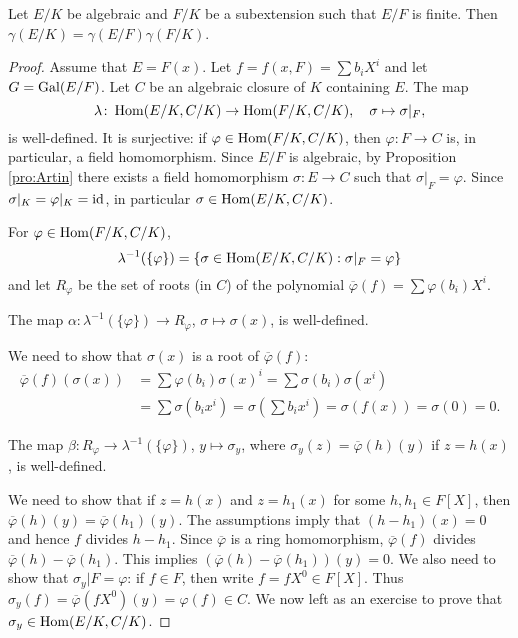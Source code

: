 \begin{proposition}
    Let $E/K$ be algebraic and $F/K$ be a subextension such that 
    $E/F$ is finite. Then $\gamma(E/K)=\gamma(E/F)\gamma(F/K)$. 
\end{proposition}

 \begin{proof}
    Assume that $E=F(x)$. Let $f=f(x,F)=\sum b_iX^i$ and
    let $G=\operatorname{Gal}(E/F)$. Let $C$ be an algebraic closure of $K$ containing $E$. 
    The map
    \[
    \lambda\colon \operatorname{Hom}(E/K,C/K)\to\operatorname{Hom}(F/K,C/K),\quad
    \sigma\mapsto\sigma|_F,
    \]
    is well-defined. It is surjective: if $\varphi\in\operatorname{Hom}(F/K,C/K)$, then $\varphi\colon F\to C$ is, 
    in particular, a field homomorphism. Since $E/F$ is algebraic, by Proposition \ref{pro:Artin} 
    there exists a field homomorphism 
    $\sigma\colon E\to C$ such that $\sigma|_F=\varphi$. Since $\sigma|_K=\varphi|_K=\operatorname{id}$, in particular 
    $\sigma\in\operatorname{Hom}(E/K,C/K)$. 
    
    For $\varphi\in\operatorname{Hom}(F/K,C/K)$,  
    \[
    \lambda^{-1}(\{\varphi\})=\{\sigma\in\operatorname{Hom}(E/K,C/K):\sigma|_F=\varphi\}
    \]
    and let $R_\varphi$ be the set of roots (in $C$) of the polynomial $\overline{\varphi}(f)=\sum\varphi(b_i)X^i$. 
    
    \begin{claim}
    The map $\alpha\colon \lambda^{-1}(\{\varphi\})\to R_{\varphi}$, $\sigma\mapsto\sigma(x)$, is well-defined. 
    \end{claim}
    
    We need to show that $\sigma(x)$ is a root of $\overline{\varphi}(f)$:
    \begin{align*}
    \overline{\varphi}(f)(\sigma(x))&=\sum \varphi(b_i)\sigma(x)^i
    =\sum\sigma(b_i)\sigma(x^i)\\
    &=\sum\sigma(b_ix^i)=\sigma\left(\sum b_ix^i\right)=\sigma(f(x))=\sigma(0)=0.
    \end{align*}
    
    \begin{claim}
    The map $\beta\colon R_{\varphi}\to \lambda^{-1}(\{\varphi\})$, $y\mapsto\sigma_y$, 
    where $\sigma_y(z)=\overline{\varphi}(h)(y)$
    if $z=h(x)$, is well-defined. 
    \end{claim}
    
    We need to show that if $z=h(x)$ and 
    $z=h_1(x)$ for some $h,h_1\in F[X]$, then 
    $\overline{\varphi}(h)(y)=\overline{\varphi}(h_1)(y)$. 
    The assumptions imply that 
    $(h-h_1)(x)=0$ and hence $f$ divides $h-h_1$. Since
    $\overline{\varphi}$ is a ring homomorphism, 
    $\overline{\varphi}(f)$ divides $\overline{\varphi}(h)-\overline{\varphi}(h_1)$. 
    This implies $(\overline{\varphi}(h)-\overline{\varphi}(h_1))(y)=0$. We also need to show that 
    $\sigma_y|F=\varphi$: if $f\in F$, then 
    write $f=fX^0\in F[X]$. Thus 
    $\sigma_y(f)=\overline{\varphi}(fX^0)(y)=\varphi(f)\in C$. 
    We now left as an exercise to prove that $\sigma_y\in\operatorname{Hom}(E/K,C/K)$. 
    

\end{proof}
